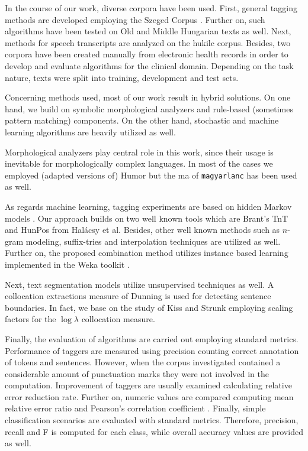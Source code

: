 In the course of our work, diverse corpora have been used. 
First, general tagging methods are developed employing the Szeged Corpus \cite{Csendes2004}.
Further on, such algorithms have been tested on Old and Middle Hungarian \cite{Novak2013} texts as well.
Next, methods for speech transcripts are analyzed on the \acrshort{hukilc} corpus\cite{Matyus2014}.
Besides, two corpora have been created manually from electronic health records in order to develop and evaluate algorithms for the clinical domain.
Depending on the task nature, texts were split into training, development and test sets.

Concerning methods used, most of our work result in hybrid solutions.
On one hand, we build on symbolic morphological analyzers and rule-based (sometimes pattern matching) components. 
On the other hand, stochastic and machine learning algorithms are heavily utilized as well.

Morphological analyzers play central role in this work, since their usage is inevitable for morphologically complex languages.
In most of the cases we employed (adapted versions \cite{Novak2013,Orosz2013} of) Humor \cite{Novak2003,Proszeky1994} but the \acrshort{ma} of \texttt{magyarlanc} \cite{zsibrata2013magyarlanc} has been used as well.

As regards machine learning, tagging experiments are based on hidden Markov models \cite{Rabiner1989,Samuelsson1993}. 
Our approach builds on two well known tools which are Brant's TnT \cite{Brants2000} and HunPos \cite{Halacsy2007} from Halácsy et al. 
Besides, other well known methods such as $n$-gram modeling, suffix-tries and interpolation techniques are utilized as well.
Further on, the proposed combination method utilizes instance based learning \cite{Aha1991} implemented in the Weka toolkit \cite{Hall2009}.

Next, text segmentation models utilize unsupervised techniques as well.
A collocation extractions measure of Dunning \cite{dunning1993accurate} is used for detecting sentence boundaries.
In fact, we base on the study of Kiss and Strunk \cite{kiss2006unsupervised} employing scaling factors for the $\log\lambda$ collocation measure.

Finally, the evaluation of algorithms are carried out employing standard metrics.
Performance of taggers are measured using precision counting correct annotation of tokens and sentences.
However, when the corpus investigated contained a considerable amount of punctuation marks they were not involved in the computation.
Improvement of taggers are usually examined calculating relative error reduction rate. 
Further on, numeric values are compared computing mean relative error \cite{Witten2011} ratio and Pearson's correlation coefficient \cite{Witten2011}.
Finally, simple classification scenarios are evaluated with standard metrics.
Therefore, precision, recall and F is computed for each class, while overall accuracy values are provided as well.